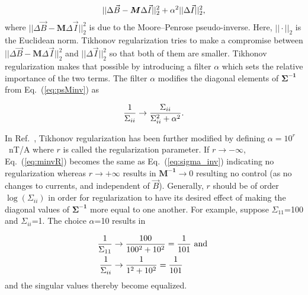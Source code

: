 \begin{equation}\label{eq:tikhonov}
    ||\Delta\Vec{B}-\bm{M}\Delta\Vec{I}||_2^2+{\alpha}^2||\Delta\Vec{I}||_2^2{\rm ,}
\end{equation}
where  $||\Delta\Vec{B}-\bm{M}\Delta\Vec{I}||_2^2$ is due to the Moore--Penrose pseudo-inverse. Here, $||\cdot ||_2$ is the Euclidean norm. Tikhonov regularization tries to make a compromise between $||\Delta\Vec{B}-\bm{M}\Delta\Vec{I}||_2^2$ and $||\Delta\Vec{I}||_2^2$ so that both of them are smaller. Tikhonov regularization makes that possible by introducing a filter $\alpha$ which sets the relative importance of the two terms. The filter $\alpha$ modifies the diagonal elements of $\bm{\Sigma^{-1}}$ from Eq.~(\ref{eq:psMinv}) as

\begin{equation}\label{eq:minvR}
    \frac{1}{\Sigma_{ii}} \rightarrow \frac{\Sigma_{ii}}{\Sigma_{ii}^2+\alpha^2}{\rm .}
\end{equation}

In Ref.~\cite{bea}, Tikhonov regularization has been further modified by defining $\alpha=10^r$~nT/A where $r$ is called the regularization parameter. If  $r \rightarrow - \infty$, Eq.~(\ref{eq:minvR}) becomes the same as Eq.~(\ref{eq:sigma_inv}) indicating no regularization whereas $r \rightarrow + \infty$ results in $\bm{M^{-1}} \rightarrow 0$ resulting no control (as no changes to currents, and independent of $\Vec{B}$). Generally, $r$ should be of order $\log(\Sigma_{ii})$ in order for regularization to have its desired effect of making the diagonal values of $\bm{\Sigma^{-1}}$ more equal to one another. For example, suppose $\Sigma_{11}$=100 and $\Sigma_{ii}$=1. The choice $\alpha$=10 results in 



\begin{align*}
    \frac{1}{\Sigma_{11}} &\rightarrow \frac{100}{100^2+10^2}=\frac{1}{101} {\rm ~and~}\\
    \frac{1}{\Sigma_{ii}} &\rightarrow \frac{1}{1^2+10^2}=\frac{1}{101} 
\end{align*}
and the singular values thereby become equalized.

